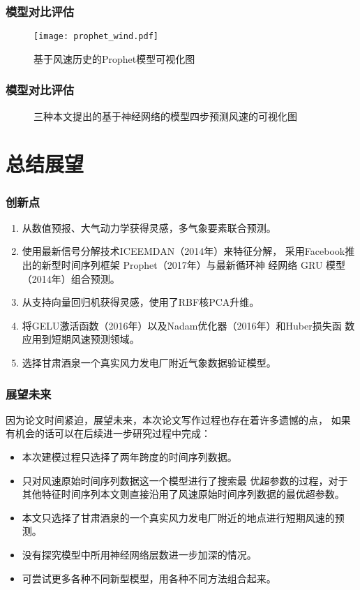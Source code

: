 \documentclass[14pt, AutoFakeBold]{ppt}
\begin{document}
\begin{frame}
  \frametitle{模型对比评估}
  \begin{figure}[H]
    \centering
      \texttt{[image: prophet\_wind.pdf]}
      \caption{基于风速历史的Prophet模型可视化图}
      \label{fig_prophet_wind}
  \end{figure}
\end{frame}

\begin{frame}
  \frametitle{模型对比评估}
  \begin{figure}[H]
    \centering
    \caption{三种本文提出的基于神经网络的模型四步预测风速的可视化图}
    \label{fig_gru_predict_test}
  \end{figure}
\end{frame}

\section{总结展望}

\begin{frame}
  \frametitle{创新点}
  \begin{enumerate}
    \item 从数值预报、大气动力学获得灵感，多气象要素联合预测。
    \item 使用最新信号分解技术ICEEMDAN（2014年）来特征分解，
    采用Facebook推出的新型时间序列框架 Prophet（2017年）与最新循环神
    经网络 GRU 模型（2014年）组合预测。
    \item 从支持向量回归机获得灵感，使用了RBF核PCA升维。
    \item 将GELU激活函数（2016年）以及Nadam优化器（2016年）和Huber损失函
    数应用到短期风速预测领域。
    \item 选择甘肃酒泉一个真实风力发电厂附近气象数据验证模型。
  \end{enumerate}
\end{frame}

\begin{frame}
  \frametitle{展望未来}
  因为论文时间紧迫，展望未来，本次论文写作过程也存在着许多遗憾的点，
  如果有机会的话可以在后续进一步研究过程中完成：
  \begin{itemize}
    \item 本次建模过程只选择了两年跨度的时间序列数据。
    \item 只对风速原始时间序列数据这一个模型进行了搜索最
    优超参数的过程，对于其他特征时间序列本文则直接沿用了风速原始时间序列数据的最优超参数。
    \item 本文只选择了甘肃酒泉的一个真实风力发电厂附近的地点进行短期风速的预测。
    \item 没有探究模型中所用神经网络层数进一步加深的情况。
    \item 可尝试更多各种不同新型模型，用各种不同方法组合起来。
  \end{itemize}
\end{frame}
\end{document}

